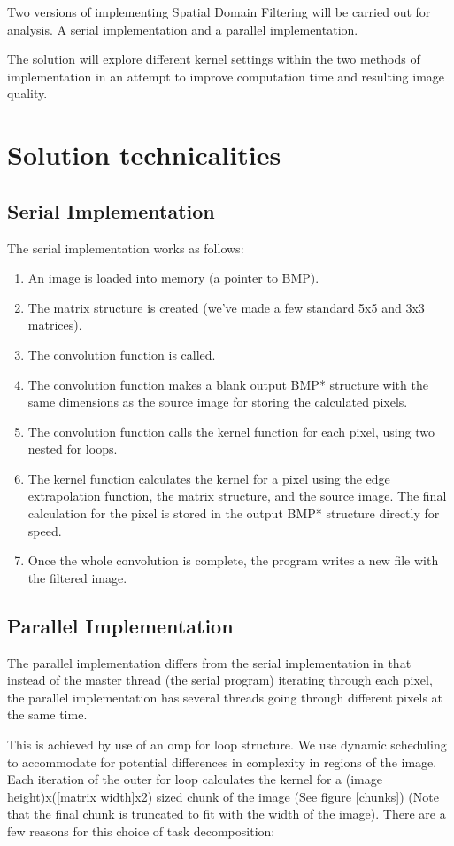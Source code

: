 \documentclass[paper=a4, fontsize=11pt]{scrartcl} %
\numberwithin{equation}{section} %
\numberwithin{figure}{section} %
\numberwithin{table}{section} %
\begin{document}
Two versions of implementing Spatial Domain Filtering will be carried out for analysis. A serial implementation and a parallel implementation.

The solution will explore different kernel settings within the two methods of implementation in an attempt to improve computation time and resulting image quality. 
\section{Solution technicalities}
\subsection{Serial Implementation}
The serial implementation works as follows:

\begin{enumerate}
\item An image is loaded into memory (a pointer to BMP).
\item The matrix structure is created (we've made a few standard 5x5 and 3x3 matrices).
\item The convolution function is called.
\item The convolution function makes a blank output BMP* structure with the same dimensions as the source image for storing the calculated pixels. 
\item The convolution function calls the kernel function for each pixel, using two nested for loops.
\item The kernel function calculates the kernel for a pixel using the edge extrapolation function, the matrix structure, and the source image. The final calculation for the pixel is stored in the output BMP* structure directly for speed.
\item Once the whole convolution is complete, the program writes a new file with the filtered image.
\end{enumerate}
  
\subsection{Parallel Implementation}
The parallel implementation differs from the serial implementation in that instead of the master thread (the serial program) iterating through each pixel, the parallel implementation has several threads going through different pixels at the same time.


This is achieved by use of an omp for loop structure. We use dynamic scheduling to accommodate for potential differences in complexity in regions of the image. Each iteration of the outer for loop calculates the kernel for a (image height)x([matrix width]x2) sized chunk of the image (See figure \ref{chunks}) (Note that the final chunk is truncated to fit with the width of the image).  There are a few reasons for this choice of task decomposition:
\end{document}
